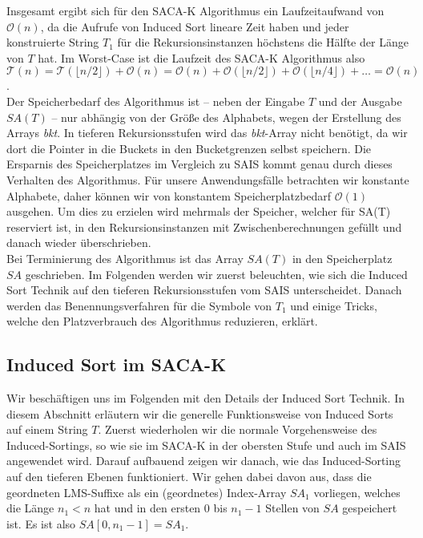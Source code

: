 Insgesamt ergibt sich für den SACA-K Algorithmus ein Laufzeitaufwand von $\mathcal O(n)$, da die Aufrufe von Induced Sort lineare Zeit haben und jeder konstruierte String $T_1$ für die Rekursionsinstanzen höchstens die Hälfte der Länge von $T$ hat. Im Worst-Case ist die Laufzeit des SACA-K Algorithmus also $\mathcal T(n) = \mathcal T(\lfloor n/2 \rfloor) + \mathcal O(n) = \mathcal O(n) + \mathcal O(\lfloor n/2 \rfloor) + \mathcal O(\lfloor n/4 \rfloor) + \ldots = \mathcal O(n)$. \\
Der Speicherbedarf des Algorithmus ist -- neben der Eingabe $T$ und der Ausgabe $SA(T)$ -- nur abhängig von der Größe des Alphabets, wegen der Erstellung des Arrays \textit{bkt}. In tieferen Rekursionsstufen wird das \textit{bkt}-Array nicht benötigt, da wir dort die Pointer in die Buckets in den Bucketgrenzen selbst speichern. Die Ersparnis des Speicherplatzes im Vergleich zu SAIS kommt genau durch dieses Verhalten des Algorithmus. Für unsere Anwendungsfälle betrachten wir konstante Alphabete, daher können wir von konstantem Speicherplatzbedarf $\mathcal O(1)$ ausgehen. Um dies zu erzielen wird mehrmals der Speicher, welcher für SA(T) reserviert ist, in den Rekursionsinstanzen mit Zwischenberechnungen gefüllt und danach wieder überschrieben.  \\

Bei Terminierung des Algorithmus ist das Array $SA(T)$ in den Speicherplatz $SA$ geschrieben. Im Folgenden werden wir zuerst beleuchten, wie sich die Induced Sort Technik auf den tieferen Rekursionsstufen vom SAIS unterscheidet. Danach werden das Benennungsverfahren für die Symbole von $T_1$ und einige Tricks, welche den Platzverbrauch des Algorithmus reduzieren, erklärt.

\subsection{Induced Sort im SACA-K}

Wir beschäftigen uns im Folgenden mit den Details der Induced Sort Technik. In diesem Abschnitt erläutern wir die generelle Funktionsweise von Induced Sorts auf einem String $T$. Zuerst wiederholen wir die normale Vorgehensweise des Induced-Sortings, so wie sie im SACA-K in der obersten Stufe und auch im SAIS angewendet wird. Darauf aufbauend zeigen wir danach, wie das Induced-Sorting auf den tieferen Ebenen funktioniert. Wir gehen dabei davon aus, dass die geordneten LMS-Suffixe als ein (geordnetes) Index-Array $SA_1$ vorliegen, welches die Länge $n_1 < n$ hat und in den ersten $0$ bis $n_1-1$ Stellen von $SA$ gespeichert ist. Es ist also $SA[0,n_1-1] = SA_1$. \pagebreak

